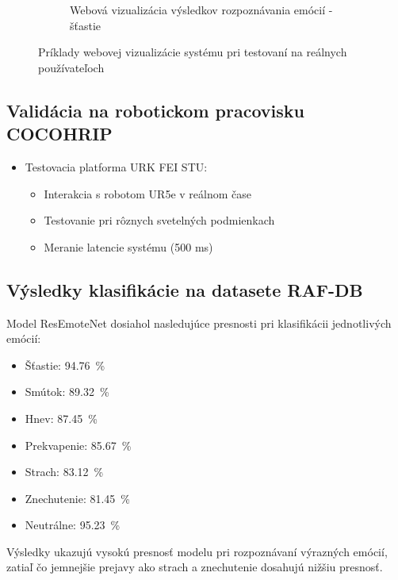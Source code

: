 \begin{figure}[!htpb]
\begin{subfigure}{0.48\textwidth}
        \caption{Webová vizualizácia výsledkov rozpoznávania emócií - šťastie}
    \end{subfigure}
    \caption{Príklady webovej vizualizácie systému pri testovaní na reálnych používateľoch}
    \label{fig:web_examples}
\end{figure}

\subsection{Validácia na robotickom pracovisku COCOHRIP}
    \begin{itemize}
\item Testovacia platforma URK FEI STU:
  \begin{itemize}
  \item Interakcia s robotom UR5e v reálnom čase
  \item Testovanie pri rôznych svetelných podmienkach
  \item Meranie latencie systému (500 ms)
  \end{itemize}
\end{itemize}

\subsection{Výsledky klasifikácie na datasete RAF-DB}
Model ResEmoteNet dosiahol nasledujúce presnosti pri klasifikácii jednotlivých emócií:
\begin{itemize}
    \item Šťastie: 94.76~\%
    \item Smútok: 89.32~\%
    \item Hnev: 87.45~\%
    \item Prekvapenie: 85.67~\%
    \item Strach: 83.12~\%
    \item Znechutenie: 81.45~\%
    \item Neutrálne: 95.23~\%
\end{itemize}

Výsledky ukazujú vysokú presnosť modelu pri rozpoznávaní výrazných emócií, zatiaľ čo jemnejšie prejavy ako strach a znechutenie dosahujú nižšiu presnosť.

